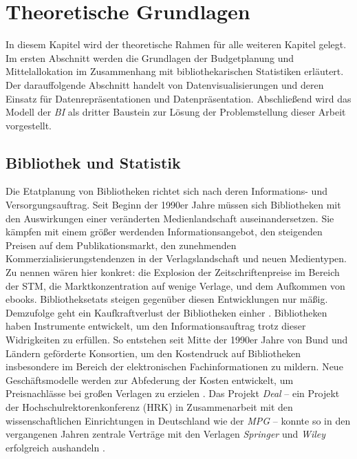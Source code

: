 \chapter{Theoretische Grundlagen}
\label{chap:two}
In diesem Kapitel wird der theoretische Rahmen für alle weiteren Kapitel gelegt. Im
ersten Abschnitt werden die Grundlagen der Budgetplanung und Mittelallokation im Zusammenhang mit bibliothekarischen Statistiken erläutert. 
Der darauffolgende Abschnitt handelt von Datenvisualisierungen und deren Einsatz
für Datenrepräsentationen und Datenpräsentation. Abschließend wird das Modell der \textit{\acrlong{BI}} als dritter Baustein zur Lösung der 
Problemstellung dieser Arbeit vorgestellt.

\section{Bibliothek und Statistik}
\label{chap:two_one}
Die Etatplanung von Bibliotheken richtet sich nach deren Informations- und Versorgungsauftrag. 
Seit Beginn der 1990er Jahre müssen sich Bibliotheken mit den Auswirkungen einer veränderten Medienlandschaft auseinandersetzen.
Sie kämpfen mit einem größer werdenden Informationsangebot, den steigenden Preisen auf dem Publikationsmarkt, 
den zunehmenden Kommerzialisierungstendenzen in der Verlagslandschaft und neuen Medientypen. 
Zu nennen wären hier konkret: die Explosion der Zeitschriftenpreise im Bereich der \acrfull{STM}, die Marktkonzentration auf wenige Verlage, 
und dem Aufkommen von ebooks. Bibliotheksetats steigen gegenüber diesen Entwicklungen nur mäßig. 
Demzufolge geht ein Kaufkraftverlust der Bibliotheken einher \cite[vgl.][164 ff.]{moravetz-kuhlmann_monika_erwerbungspolitik_2015}.
Bibliotheken haben Instrumente entwickelt, um den Informationsauftrag trotz dieser Widrigkeiten zu erfüllen.
So entstehen seit Mitte der 1990er Jahre von Bund und Ländern geförderte Konsortien, um den Kostendruck auf Bibliotheken insbesondere im Bereich der elektronischen
Fachinformationen zu mildern. Neue Geschäftsmodelle werden zur Abfederung der Kosten entwickelt, um Preisnachlässe bei großen Verlagen zu erzielen
\cite[vgl.][169 ff.]{moravetz-kuhlmann_monika_erwerbungspolitik_2015}. Das Projekt \textit{Deal} -- ein Projekt der Hochschulrektorenkonferenz (HRK) in Zusammenarbeit mit den
wissenschaftlichen Einrichtungen in Deutschland wie der \textit{\acrshort{MPG}} -- konnte so in den vergangenen Jahren zentrale Verträge mit den Verlagen \textit{Springer} und \textit{Wiley}
erfolgreich aushandeln \cite[vgl.][]{projekt_deal_projekt_2020}.

